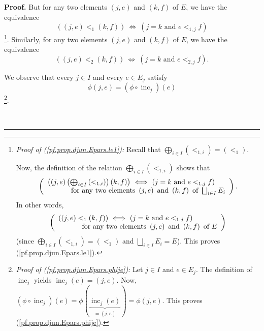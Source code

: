 \documentclass[numbers=enddot,12pt,final,onecolumn,notitlepage,abstracton]{scrartcl}
\theoremstyle{definition}
\newenvironment{proof}[1][Proof]{\noindent\textbf{#1.} }{\ \rule{0.5em}{0.5em}}
\newenvironment{verlong}{}{}
\begin{document}
\begin{verlong}
\begin{footnotesize}
\begin{proof}
But for any two elements $\left(  j,e\right)  $ and $\left(  k,f\right)  $ of
$E$, we have the equivalence%
\begin{equation}
\left(  \left(  j,e\right)  <_{1}\left(  k,f\right)  \right)
\ \Longleftrightarrow\ \left(  j=k\text{ and }e<_{1,j}f\right)
\label{pf.prop.djun.Epars.le1}%
\end{equation}
\footnote{\textit{Proof of (\ref{pf.prop.djun.Epars.le1}):} Recall that
$\bigoplus_{i\in I}\left(  <_{1,i}\right)  =\left(  <_{1}\right)  $.
\par
Now, the definition of the relation $\bigoplus_{i\in I}\left(  <_{1,i}\right)
$ shows that%
\[
\left(
\begin{array}
[c]{l}%
\left(  \left(  j,e\right)  \left(  \bigoplus_{i\in I}\left(  <_{1,i}\right)
\right)  \left(  k,f\right)  \right)  \ \Longleftrightarrow\ \left(  j=k\text{
and }e<_{1,j}f\right) \\
\ \ \ \ \ \ \ \ \ \ \text{for any two elements }\left(  j,e\right)  \text{ and
}\left(  k,f\right)  \text{ of }\bigsqcup_{i\in I}E_{i}%
\end{array}
\right)  .
\]
In other words,%
\[
\left(
\begin{array}
[c]{l}%
\left(  \left(  j,e\right)  <_{1}\left(  k,f\right)  \right)
\ \Longleftrightarrow\ \left(  j=k\text{ and }e<_{1,j}f\right) \\
\ \ \ \ \ \ \ \ \ \ \text{for any two elements }\left(  j,e\right)  \text{ and
}\left(  k,f\right)  \text{ of }E
\end{array}
\right)
\]
(since $\bigoplus_{i\in I}\left(  <_{1,i}\right)  =\left(  <_{1}\right)  $ and
$\bigsqcup_{i\in I}E_{i}=E$). This proves (\ref{pf.prop.djun.Epars.le1}).}.
Similarly, for any two elements $\left(  j,e\right)  $ and $\left(
k,f\right)  $ of $E$, we have the equivalence%
\begin{equation}
\left(  \left(  j,e\right)  <_{2}\left(  k,f\right)  \right)
\ \Longleftrightarrow\ \left(  j=k\text{ and }e<_{2,j}f\right)  .
\label{pf.prop.djun.Epars.le2}%
\end{equation}


We observe that every $j\in I$ and every $e\in E_{j}$ satisfy%
\begin{equation}
\phi\left(  j,e\right)  =\left(  \phi\circ\operatorname*{inc}\nolimits_{j}%
\right)  \left(  e\right)  \label{pf.prop.djun.Epars.phije}%
\end{equation}
\footnote{\textit{Proof of (\ref{pf.prop.djun.Epars.phije}):} Let $j\in I$ and
$e\in E_{j}$. The definition of $\operatorname*{inc}\nolimits_{j}$ yields
$\operatorname*{inc}\nolimits_{j}\left(  e\right)  =\left(  j,e\right)  $.
Now, $\left(  \phi\circ\operatorname*{inc}\nolimits_{j}\right)  \left(
e\right)  =\phi\left(  \underbrace{\operatorname*{inc}\nolimits_{j}\left(
e\right)  }_{=\left(  j,e\right)  }\right)  =\phi\left(  j,e\right)  $. This
proves (\ref{pf.prop.djun.Epars.phije}).}.


\end{proof}
\end{footnotesize}
\end{verlong}
\end{document}
